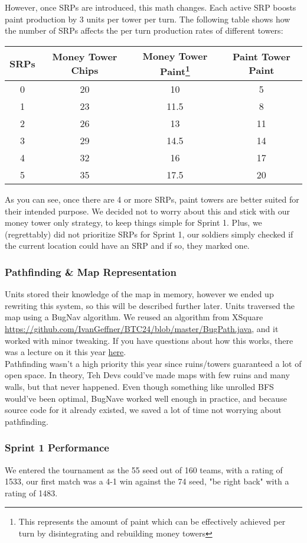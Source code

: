 \documentclass{article}
\begin{document}
  However, once SRPs are introduced, this math changes. Each active SRP boosts paint production by 3 units per tower per turn. The following table shows how the number of SRPs affects the per turn production rates of different towers:
  \begin{center}
    \begin{tabular}{c | c | c | c}
      SRPs & Money Tower Chips & Money Tower Paint\footnote{This represents the amount of paint which can be effectively achieved per turn by disintegrating and rebuilding money towers} & Paint Tower Paint \\
      \hline
      0 & 20 & 10 & 5 \\
      1 & 23 & 11.5 & 8 \\
      2 & 26 & 13 & 11 \\
      3 & 29 & 14.5 & 14 \\
      4 & 32 & 16 & 17 \\
      5 & 35 & 17.5 & 20
    \end{tabular}
  \end{center}
  As you can see, once there are 4 or more SRPs, paint towers are better suited for their intended purpose. We decided not to worry about this and stick with our money tower only strategy, to keep things simple for Sprint 1. Plus, we (regrettably) did not prioritize SRPs for Sprint 1, our soldiers simply checked if the current location could have an SRP and if so, they marked one.

  \subsubsection{Pathfinding \& Map Representation}

  Units stored their knowledge of the map in memory, however we ended up rewriting this system, so this will be described further later. Units traversed the map using a BugNav algorithm. We reused an algorithm from XSquare \url{https://github.com/IvanGeffner/BTC24/blob/master/BugPath.java}, and it worked with minor tweaking. If you have questions about how this works, there was a lecture on it this year \href{https://www.youtube.com/live/Mqk50BQH3oQ?si=6qL5WAXmSOS2K3OR}{here}.\\
  Pathfinding wasn't a high priority this year since ruins/towers guaranteed a lot of open space. In theory, Teh Devs could've made maps with few ruins and many walls, but that never happened. Even though something like unrolled BFS would've been optimal, BugNave worked well enough in practice, and because source code for it already existed, we saved a lot of time not worrying about pathfinding.
  
  \subsubsection{Sprint 1 Performance}

  We entered the tournament as the 55 seed out of 160 teams, with a rating of 1533, our first match was a 4-1 win against the 74 seed, "be right back" with a rating of 1483. 
\end{document}
